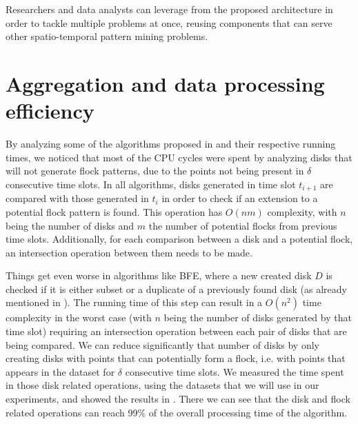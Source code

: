 Researchers and data analysts can leverage from the proposed architecture in order to tackle multiple problems at once,
reusing components that can serve other spatio-temporal pattern mining problems.

\section{Aggregation and data processing efficiency}
\label{sec:bitdf}
By analyzing some of the algorithms proposed in  and their respective running times, we noticed
that most of the CPU cycles were spent by analyzing disks that will not generate flock patterns, due to the points not
being present in $\delta$ consecutive time slots. In all algorithms, disks generated in time slot $t_{i+1}$ are compared
with those generated in $t_{i}$ in order to check if an extension to a potential flock pattern is found. This operation
has $O(nm)$ complexity, with $n$ being the number of disks and $m$ the number of potential flocks from previous time
slots.  Additionally, for each comparison between a disk and a potential flock, an intersection operation between them
needs to be made.

Things get even worse in algorithms like BFE, where a new created disk $D$ is checked if it is either subset or a
duplicate of a previously found disk (as already mentioned in ). The running time of this
step can result in a $O(n^2)$ time complexity in the worst case (with $n$ being the number of disks generated by that
time slot) requiring an intersection operation between each pair of disks that are being compared. We can reduce
significantly that number of disks by only creating disks with points that can potentially form a flock, i.e. with
points that appears in the dataset for $\delta$ consecutive time slots. We measured the time spent in those disk related
operations, using the datasets that we will use in our experiments, and showed the results in
. There we can see that the disk and flock related operations can reach 99\% of the overall
processing time of the algorithm.

